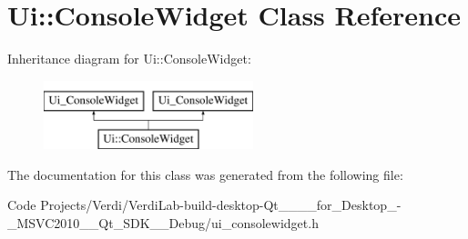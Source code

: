 \hypertarget{class_ui_1_1_console_widget}{\section{\-Ui\-:\-:\-Console\-Widget \-Class \-Reference}
\label{class_ui_1_1_console_widget}
}
\-Inheritance diagram for \-Ui\-:\-:\-Console\-Widget\-:\begin{figure}[H]
\begin{center}
\leavevmode
\includegraphics[height=2.000000cm]{class_ui_1_1_console_widget}
\end{center}
\end{figure}


\-The documentation for this class was generated from the following file\-:\begin{DoxyCompactItemize}
\item 
\-Code Projects/\-Verdi/\-Verdi\-Lab-\/build-\/desktop-\/\-Qt\-\_\-\_\-\_\-\_\-for\-\_\-\-Desktop\-\_\--\/\-\_\-\-M\-S\-V\-C2010\-\_\-\-\_\-\-Qt\-\_\-\-S\-D\-K\-\_\-\-\_\-\-Debug/ui\-\_\-consolewidget.\-h\end{DoxyCompactItemize}
